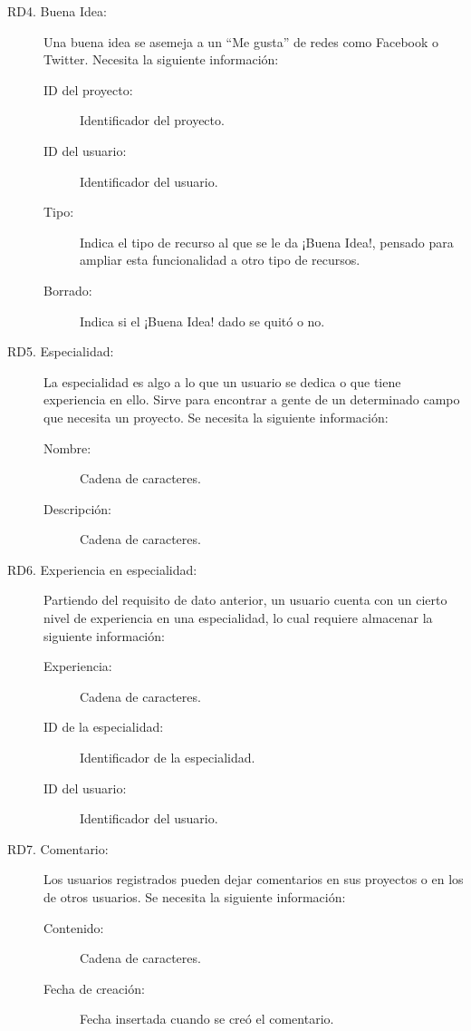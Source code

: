 \begin{description}
\begin{description}
        \end{description}
    \item[RD4. Buena Idea:] Una buena idea se asemeja a un ``Me gusta'' de redes como Facebook o Twitter. Necesita la siguiente información:
        \begin{description}
            \item[ID del proyecto:] Identificador del proyecto.
            \item[ID del usuario:] Identificador del usuario.
            \item[Tipo:] Indica el tipo de recurso al que se le da ¡Buena Idea!, pensado para ampliar esta funcionalidad a otro tipo de recursos.
            \item[Borrado:] Indica si el ¡Buena Idea! dado se quitó o no.
        \end{description}
    \item[RD5. Especialidad:] La especialidad es algo a lo que un usuario se dedica o que tiene experiencia en ello. Sirve para encontrar a gente de un determinado campo que necesita un proyecto. Se necesita la siguiente información:
        \begin{description}
            \item[Nombre:] Cadena de caracteres.
            \item[Descripción:] Cadena de caracteres.
        \end{description}
    \item[RD6. Experiencia en especialidad:] Partiendo del requisito de dato anterior, un usuario cuenta con un cierto nivel de experiencia en una especialidad, lo cual requiere almacenar la siguiente información:
        \begin{description}
            \item[Experiencia:] Cadena de caracteres.
            \item[ID de la especialidad:] Identificador de la especialidad.
            \item[ID del usuario:] Identificador del usuario.
        \end{description}
    \item[RD7. Comentario:] Los usuarios registrados pueden dejar comentarios en sus proyectos o en los de otros usuarios. Se necesita la siguiente información:
        \begin{description}
            \item[Contenido:] Cadena de caracteres.
            \item[Fecha de creación:] Fecha insertada cuando se creó el comentario.

\end{description}
\end{description}
